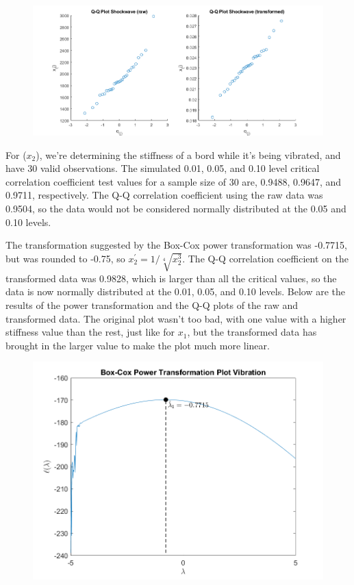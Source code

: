 \begin{center}
    \begin{figure}[H]
        \centering
        \includegraphics[scale=0.4]{./matlab/chapter-4/sol4.33.qq.1.png}
    \end{figure}
\end{center}

For ($x_{2}$), we're determining the stiffness of a bord while it's being vibrated, and have 30 valid observations. The simulated 0.01, 0.05, and 0.10 level critical correlation coefficient test values for a sample size of 30 are, 0.9488, 0.9647, and 0.9711, respectively. The Q-Q correlation coefficient using the raw data was 0.9504, so the data would not be considered normally distributed at the 0.05 and 0.10 levels.

The transformation suggested by the Box-Cox power transformation was -0.7715, but was rounded to -0.75, so $x_{2}^{\prime} = 1/\sqrt[4]{x_{2}^{3}}$. The Q-Q correlation coefficient on the transformed data was 0.9828, which is larger than all the critical values, so the data is now normally distributed at the 0.01, 0.05, and 0.10 levels. Below are the results of the power transformation and the Q-Q plots of the raw and transformed data. The original plot wasn't too bad, with one value with a higher stiffness value than the rest, just like for $x_{1}$, but the transformed data has brought in the larger value to make the plot much more linear.

\begin{center}
    \begin{figure}[H]
        \centering
        \includegraphics[scale=0.6]{./matlab/chapter-4/sol4.33.power.2.png}
    \end{figure}
\end{center}

